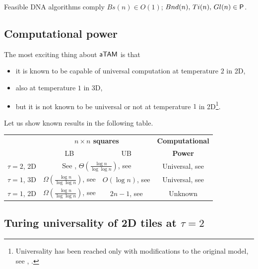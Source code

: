 	\begin{thesis}
	\label{ths:feasible}
		Feasible DNA algorithms comply $Bs(n)\in O(1)$; $Bnd(n),\,Ti(n),\,Gl(n)\in \P$.
	\end{thesis}


\subsection{Computational power}\label{sec:wang_power}
	
	The most exciting thing about $\atam$ is that
	\begin{itemize}
		\item it is known to be capable of universal computation at temperature $2$ in 2D,
		\item also at temperature $1$ in 3D,
		\item but it is not known to be universal or not at temperature $1$ in 2D\footnote{Universality has been reached only with modifications to the original model, see \cite{stage_assembly}, \cite{active_tiles}.}.
	\end{itemize}
	Let us show known results in the following table.
	
	\begin{center}
	\begin{tabular}{|| c || c | c | c ||}
		\hline\hline
		~ & \multicolumn{2}{c|}{\bf $n\times n$ squares} & {\bf Computational} \\
		~ & \multicolumn{1}{c}{LB} & \multicolumn{1}{c|}{UB} & {\bf Power}\\
		\hline
		$\tau=2$, 2D & \multicolumn{2}{c|}{See \cite{square_lb}, $\Theta(\frac{\log n}{\log\log n})$, see \cite{square_ub}} & Universal, see \cite{winfree_phd} \\
		\hline
		$\tau=1$, 3D & $\Omega(\frac{\log n}{\log\log n})$, see \cite{square_lb} & $O(\log n)$, see \cite{cook_temp1} & Universal, see \cite{cook_temp1} \\
		\hline
		$\tau=1$, 2D & $\Omega(\frac{\log n}{\log\log n})$, see \cite{square_lb} & $2n-1$, see \cite{square_lb} & Unknown \\
		\hline\hline
	\end{tabular}
	\end{center}


\subsection{Turing universality of 2D tiles at $\tau=2$}
	
